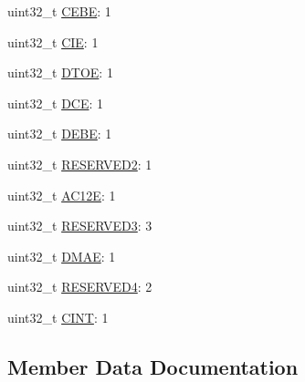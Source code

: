 \begin{DoxyCompactItemize}
\item 
uint32\+\_\+t \hyperlink{struct__hw__sdhc__fevt_1_1__hw__sdhc__fevt__bitfields_a9cecab580e113713b872e228720414a5}{C\+E\+BE}\+: 1
\item 
uint32\+\_\+t \hyperlink{struct__hw__sdhc__fevt_1_1__hw__sdhc__fevt__bitfields_a0a24e7b81fcb22b84a18df85bcbbc4d2}{C\+IE}\+: 1
\item 
uint32\+\_\+t \hyperlink{struct__hw__sdhc__fevt_1_1__hw__sdhc__fevt__bitfields_a5d2825cc95bd49ee187c5805b2ccb1d1}{D\+T\+OE}\+: 1
\item 
uint32\+\_\+t \hyperlink{struct__hw__sdhc__fevt_1_1__hw__sdhc__fevt__bitfields_a57ebeb1472ae3d50d597939862b6980f}{D\+CE}\+: 1
\item 
uint32\+\_\+t \hyperlink{struct__hw__sdhc__fevt_1_1__hw__sdhc__fevt__bitfields_aa1c4c81a4fca675ee9c584fa2a0012b3}{D\+E\+BE}\+: 1
\item 
uint32\+\_\+t \hyperlink{struct__hw__sdhc__fevt_1_1__hw__sdhc__fevt__bitfields_ad8d6b26d1caf73aa23c6af5c191b54f2}{R\+E\+S\+E\+R\+V\+E\+D2}\+: 1
\item 
uint32\+\_\+t \hyperlink{struct__hw__sdhc__fevt_1_1__hw__sdhc__fevt__bitfields_a34054b7fa62c0c82edba9c78c5fc784f}{A\+C12E}\+: 1
\item 
uint32\+\_\+t \hyperlink{struct__hw__sdhc__fevt_1_1__hw__sdhc__fevt__bitfields_a8efcdbec8a0c2e0d7b3c37d8d7ef4ab6}{R\+E\+S\+E\+R\+V\+E\+D3}\+: 3
\item 
uint32\+\_\+t \hyperlink{struct__hw__sdhc__fevt_1_1__hw__sdhc__fevt__bitfields_a74b9d3c9dfb048867a02845ac3e3494a}{D\+M\+AE}\+: 1
\item 
uint32\+\_\+t \hyperlink{struct__hw__sdhc__fevt_1_1__hw__sdhc__fevt__bitfields_a7d00635c7e52a9cd1342842201f917dc}{R\+E\+S\+E\+R\+V\+E\+D4}\+: 2
\item 
uint32\+\_\+t \hyperlink{struct__hw__sdhc__fevt_1_1__hw__sdhc__fevt__bitfields_a0f5468321a28d53288b60ce56df753d8}{C\+I\+NT}\+: 1
\end{DoxyCompactItemize}


\subsection{Member Data Documentation}
